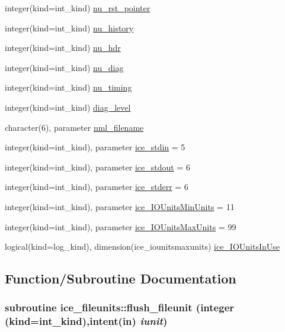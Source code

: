 \begin{DoxyCompactItemize}
\item 
integer(kind=int\_\-kind) \hyperlink{namespaceice__fileunits_aef0d982897260808734543575407020b}{nu\_\-rst\_\-pointer}
\item 
integer(kind=int\_\-kind) \hyperlink{namespaceice__fileunits_a5ef8e946ea55345ba52282ad21ff1d91}{nu\_\-history}
\item 
integer(kind=int\_\-kind) \hyperlink{namespaceice__fileunits_ad736df9f3244eeab32a92724cef14695}{nu\_\-hdr}
\item 
integer(kind=int\_\-kind) \hyperlink{namespaceice__fileunits_a5a65f292ace9ba700843f3e293922842}{nu\_\-diag}
\item 
integer(kind=int\_\-kind) \hyperlink{namespaceice__fileunits_a4bd0122585694768cb4c57dd73954900}{nu\_\-timing}
\item 
integer(kind=int\_\-kind) \hyperlink{namespaceice__fileunits_a65eb74a162a71d932a76d174b05903a5}{diag\_\-level}
\item 
character(6), parameter \hyperlink{namespaceice__fileunits_aec528ed6b00fd0cb2d1e2c5892835bd1}{nml\_\-filename}
\item 
integer(kind=int\_\-kind), parameter \hyperlink{namespaceice__fileunits_ad61888d9e876b102bb3e1c2b6653eadc}{ice\_\-stdin} = 5
\item 
integer(kind=int\_\-kind), parameter \hyperlink{namespaceice__fileunits_a36939520ad7720151c3579da581946e7}{ice\_\-stdout} = 6
\item 
integer(kind=int\_\-kind), parameter \hyperlink{namespaceice__fileunits_aa45e19d657680ed407b944234295c499}{ice\_\-stderr} = 6
\item 
integer(kind=int\_\-kind), parameter \hyperlink{namespaceice__fileunits_a4398f02a1fc60cb19a367c3c398c3912}{ice\_\-IOUnitsMinUnits} = 11
\item 
integer(kind=int\_\-kind), parameter \hyperlink{namespaceice__fileunits_a51e62a76a75cf9695476d895543860a8}{ice\_\-IOUnitsMaxUnits} = 99
\item 
logical(kind=log\_\-kind), dimension(ice\_\-iounitsmaxunits) \hyperlink{namespaceice__fileunits_ac18233d112e8380d29b2a9269451ea4b}{ice\_\-IOUnitsInUse}
\end{DoxyCompactItemize}


\subsection{Function/Subroutine Documentation}
\hypertarget{namespaceice__fileunits_a78c54163676e7d85998ab6bd968c1c52}{
\subsubsection[{flush\_\-fileunit}]{\setlength{\rightskip}{0pt plus 5cm}subroutine ice\_\-fileunits::flush\_\-fileunit (integer (kind=int\_\-kind),intent(in) {\em iunit})}}
\label{namespaceice__fileunits_a78c54163676e7d85998ab6bd968c1c52}


